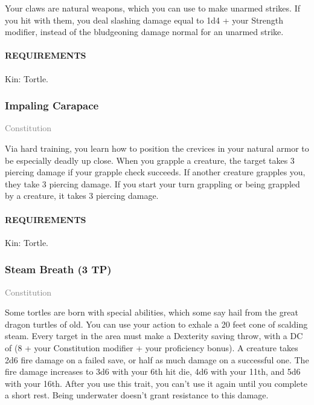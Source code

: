    \normalsize
    Your claws are natural weapons, which you can use to make unarmed strikes.
    If you hit with them, you deal slashing damage equal to 1d4 + your Strength modifier, instead of the bludgeoning damage normal for an unarmed strike.
    \paragraph{REQUIREMENTS} Kin: Tortle.

    \subsubsection{Impaling Carapace} \label{feat::impalingcarapace}
    \small{\textcolor{gray}{Constitution}}

    \normalsize
    Via hard training, you learn how to position the crevices in your natural armor to be especially deadly up close.
    When you grapple a creature, the target takes 3 piercing damage if your grapple check succeeds.
    If another creature grapples you, they take 3 piercing damage.
    If you start your turn grappling or being grappled by a creature, it takes 3 piercing damage.
    \paragraph{REQUIREMENTS} Kin: Tortle.

    \subsubsection{Steam Breath (3 TP)} \label{feat::steambreath}
    \small{\textcolor{gray}{Constitution}}

    \normalsize
    Some tortles are born with special abilities, which some say hail from the great dragon turtles of old.
    You can use your action to exhale a 20 feet cone of scalding steam.
    Every target in the area must make a Dexterity saving throw, with a DC of (8 + your Constitution modifier + your proficiency bonus).
    A creature takes 2d6 fire damage on a failed save, or half as much damage on a successful one.
    The fire damage increases to 3d6 with your 6th hit die, 4d6 with your 11th, and 5d6 with your 16th.
    After you use this trait, you can't use it again until you complete a short rest.
    Being underwater doesn't grant resistance to this damage.

